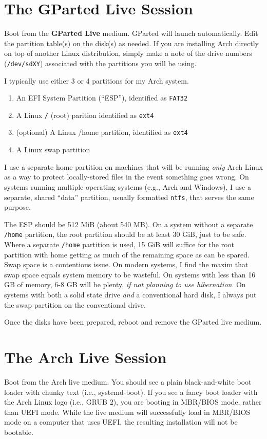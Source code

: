 \documentclass[letterpaper,12pt]{article}
\newcommand{\p}{\par\bigskip}
\begin{document}
\section{The GParted Live Session}
Boot from the {\bf GParted Live} medium. GParted will launch automatically. Edit the partition table(s) on the disk(s) as needed. If you are installing Arch directly on top of another Linux distribution, simply make a note of the drive numbers ({\tt /dev/sdXY}) associated with the partitions you will be using. \p

I typically use either 3 or 4 partitions for my Arch system.
\begin{enumerate}
  \item An EFI System Partition (``ESP''), identified as {\tt FAT32}
  \item A Linux {\tt /} (root) parition identified as {\tt ext4}
  \item (optional) A Linux {/home} partition, identified as {\tt ext4}
  \item A Linux swap partition
\end{enumerate}
I use a separate home partition on machines that will be running {\em only} Arch Linux as a way to protect locally-stored files in the event something goes wrong. On systems running multiple operating systems (e.g., Arch and Windows), I use a separate, shared ``data'' partition, usually formatted {\tt ntfs}, that serves the same purpose. \p

The ESP should be 512 MiB (about 540 MB). On a system without a separate {\tt /home} partition, the root partition should be at least 30 GiB, just to be safe. Where a separate {\tt /home} partition is used, 15 GiB will suffice for the root partition with home getting as much of the remaining space as can be spared. Swap space is a contentious issue. On modern systems, I find the maxim that swap space equals system memory to be wasteful. On systems with less than 16 GB of memory, 6-8 GB will be plenty, {\em if not planning to use hibernation}. On systems with both a solid state drive {\em and} a conventional hard disk, I always put the swap partition on the conventional drive. \p

Once the disks have been prepared, reboot and remove the GParted live medium.

\section{The Arch Live Session}
Boot from the Arch live medium. You should see a plain black-and-white boot loader with chunky text (i.e., systemd-boot). If you see a fancy boot loader with the Arch Linux logo (i.e., GRUB 2), you are booting in MBR/BIOS mode, rather than UEFI mode. While the live medium will successfully load in MBR/BIOS mode on a computer that uses UEFI, the resulting installation will not be bootable. \p
\end{document}
